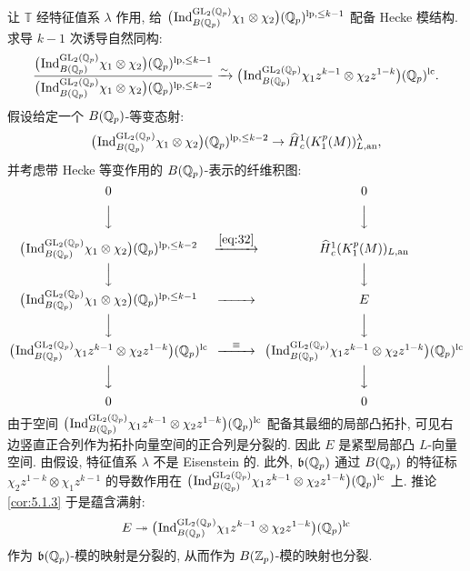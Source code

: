 让 $\mathbb{T}$ 经特征值系 $\lambda$ 作用, 给 $\bigl(\prescript{}{}{\mathrm{Ind}}_{B(\mathbb{Q}_p)}^{\mathrm{GL}_2(\mathbb{Q}_p)} \chi_1 \otimes \chi_2\bigr)(\mathbb{Q}_p)^{\mathrm{lp},\le k-1}$ 配备 Hecke 模结构.
求导 $k-1$ 次诱导自然同构:
\[
\frac{\bigl(\prescript{}{}{\mathrm{Ind}}_{B(\mathbb{Q}_p)}^{\mathrm{GL}_2(\mathbb{Q}_p)} \chi_1 \otimes \chi_2\bigr)(\mathbb{Q}_p)^{\mathrm{lp},\le k-1}}{\bigl(\prescript{}{}{\mathrm{Ind}}_{B(\mathbb{Q}_p)}^{\mathrm{GL}_2(\mathbb{Q}_p)} \chi_1 \otimes \chi_2\bigr)(\mathbb{Q}_p)^{\mathrm{lp},\le k-2}}
\xrightarrow{\sim} \bigl(\prescript{}{}{\mathrm{Ind}}_{B(\mathbb{Q}_p)}^{\mathrm{GL}_2(\mathbb{Q}_p)} \chi_1z^{k-1} \otimes \chi_2z^{1-k}\bigr)(\mathbb{Q}_p)^{\mathrm{lc}}.
\]
假设给定一个 $B(\mathbb{Q}_p)$-等变态射:
\begin{equation}
\label{eq:32}
\bigl(\prescript{}{}{\mathrm{Ind}}_{B(\mathbb{Q}_p)}^{\mathrm{GL}_2(\mathbb{Q}_p)} \chi_1 \otimes \chi_2\bigr)(\mathbb{Q}_p)^{\mathrm{lp},\le k-2} \to \widehat{H}{}_{c}^{1}(K_1^{p}(M))_{L,\mathrm{an}}^{\lambda},
\end{equation}
并考虑带 Hecke 等变作用的 $B(\mathbb{Q}_p)$-表示的纤维积图:
\[
\begin{CD}
0 @. 0\\
@VVV @VVV\\
\bigl(\pind{}_{B(\Qp)}^{\GL_2(\Qp)} \chi_1 \otimes \chi_2\bigr)(\Qp)^{\mathrm{lp},\le k-2} @>{\eqref{eq:32}}>> \widehat{H}{}_{c}^{1}(K_1^{p}(M))_{L,\mathrm{an}}\\
@VVV @VVV\\
\bigl(\pind{}_{B(\Qp)}^{\GL_2(\Qp)} \chi_1 \otimes \chi_2\bigr)(\Qp)^{\mathrm{lp},\le k-1} @>>> E\\
@VVV @VVV\\
\bigl(\pind{}_{B(\Qp)}^{\GL_2(\Qp)} \chi_1z^{k-1} \otimes \chi_2z^{1-k}\bigr)(\Qp)^{\mathrm{lc}} @>{\equiv}>> \bigl(\pind{}_{B(\Qp)}^{\GL_2(\Qp)} \chi_1z^{k-1} \otimes \chi_2z^{1-k}\bigr)(\Qp)^{\mathrm{lc}}\\
@VVV @VVV\\
0 @. 0
\end{CD}
\]
由于空间 $\bigl(\prescript{}{}{\mathrm{Ind}}_{B(\mathbb{Q}_p)}^{\mathrm{GL}_2(\mathbb{Q}_p)} \chi_1z^{k-1} \otimes \chi_2z^{1-k}\bigr)(\mathbb{Q}_p)^{\mathrm{lc}}$ 配备其最细的局部凸拓扑, 可见右边竖直正合列作为拓扑向量空间的正合列是分裂的.
因此 $E$ 是紧型局部凸 $L$-向量空间.
由假设, 特征值系 $\lambda$ 不是 Eisenstein 的.
此外, $\mathfrak{b}(\mathbb{Q}_p)$ 通过 $B(\mathbb{Q}_p)$ 的特征标 $\chi_2z^{1-k} \otimes \chi_1z^{k-1}$ 的导数作用在 $\bigl(\prescript{}{}{\mathrm{Ind}}_{B(\mathbb{Q}_p)}^{\mathrm{GL}_2(\mathbb{Q}_p)} \chi_1z^{k-1} \otimes \chi_2z^{1-k}\bigr)(\mathbb{Q}_p)^{\mathrm{lc}}$ 上.
推论 \ref{cor:5.1.3} 于是蕴含满射:
\begin{equation}
\label{eq:33}
E \twoheadrightarrow \bigl(\prescript{}{}{\mathrm{Ind}}_{B(\mathbb{Q}_p)}^{\mathrm{GL}_2(\mathbb{Q}_p)} \chi_1z^{k-1} \otimes \chi_2z^{1-k}\bigr)(\mathbb{Q}_p)^{\mathrm{lc}}
\end{equation}
作为 $\mathfrak{b}(\mathbb{Q}_p)$-模的映射是分裂的, 从而作为 $B(\mathbb{Z}_p)$-模的映射也分裂.

